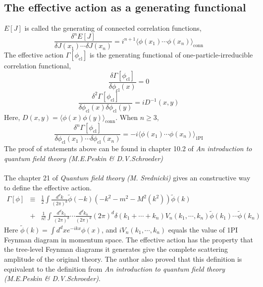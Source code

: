 \subsection{The effective action as a generating functional}
$E[J]$ is called the generating of connected correlation functions,
\[\frac{\delta^n E[J]}{\delta J(x_1) \cdots \delta J(x_n)} = i^{n+1} \langle \phi(x_1) \cdots \phi(x_n) \rangle_{\mbox{conn}}\]
The effective action $\Gamma[\phi_{\mathrm{cl}}]$ is the generating functional of one-particle-irreducible correlation functional,
\[\frac{\delta \Gamma[\phi_{\mathrm{cl}}]}{\delta \phi_{\mathrm{cl}}(x)}  = 0\]
\[\frac{\delta^2 \Gamma[\phi_{\mathrm{cl}}]}{\delta \phi_{\mathrm{cl}}(x) \delta \phi_{\mathrm{cl}}(y)}  = iD^{-1}(x,y)\]
Here, $D(x,y) = \langle \phi(x) \phi(y) \rangle_{\mbox{conn}}$. When $n \geq 3$,
\[\frac{\delta^n \Gamma[\phi_{\mathrm{cl}}]}{\delta \phi_{\mathrm{cl}}(x_1) \cdots \delta \phi_{\mathrm{cl}}(x_n)} = -i \langle \phi(x_1) \cdots \phi(x_n) \rangle_{\mbox{1PI}}\]
The proof of statements above can be found in chapter 10.2 of \emph{An introduction to quantum field theory (M.E.Peskin \& D.V.Schroeder)}\\ \\
The chapter 21 of \emph{Quantum field theory (M. Srednicki)} gives an constructive way to define the effective action.
\begin{eqnarray}
\Gamma[\phi] & \equiv & \frac{1}{2} \int \frac{d^d k}{(2\pi)^d} \tilde{\phi}(-k)(-k^2 - m^2 - M^2(k^2))\tilde{\phi}(k) \nonumber \\
& + & \frac{1}{n!} \int \frac{d^d k_1}{(2\pi)^d} \cdots \frac{d^d k_n}{(2\pi)^d} (2\pi)^d \delta(k_1+\cdots+k_n) V_n(k_1,\cdots,k_n) \tilde{\phi}(k_1) \cdots \tilde{\phi}(k_n) \nonumber
\end{eqnarray}
Here $\tilde{\phi}(k) = \int d^dx e^{-ikx} \phi(x)$, and $iV_n(k_1,\cdots,k_n)$ equals the value of 1PI Feynman diagram in momentum space. The effective action has the property that the tree-level Feynman diagrams it generates give the complete scattering amplitude of the original theory. The author also proved that this definition is equivalent to the definition from \emph{An introduction to quantum field theory (M.E.Peskin \& D.V.Schroeder)}.
  
